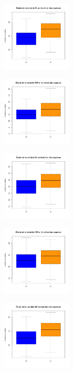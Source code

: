 \documentclass[10pt]{article}
\begin{document}
\begin{center}
	\begin{minipage}[t]{0.3\textwidth}
		\includegraphics[width=35mm]{Figures/Crabs/bxp_sp_fl.png}
	\end{minipage}
	\begin{minipage}[t]{0.3\textwidth}
		\includegraphics[width=35mm]{Figures/Crabs/bxp_sp_rw.png}	
	\end{minipage}
	\begin{minipage}[t]{0.3\textwidth}
		\includegraphics[width=35mm]{Figures/Crabs/bxp_sp_cl.png}
	\end{minipage}
	\newline
	\begin{minipage}[t]{0.3\textwidth}
		\includegraphics[width=35mm]{Figures/Crabs/bxp_sp_cw.png}	
	\end{minipage}
	\begin{minipage}[t]{0.3\textwidth}
		\includegraphics[width=35mm]{Figures/Crabs/bxp_sp_bd.png}
	\end{minipage}
\end{center}
\end{document}
